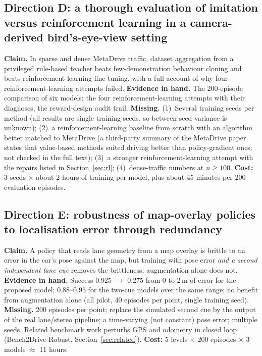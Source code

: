 \subsection{Direction D: a thorough evaluation of imitation versus reinforcement learning in a camera-derived bird's-eye-view setting}
\textbf{Claim.} In sparse and dense MetaDrive traffic, dataset aggregation from a privileged rule-based teacher beats few-demonstration behaviour cloning and beats reinforcement-learning fine-tuning, with a full account of why four reinforcement-learning attempts failed.
\textbf{Evidence in hand.} The 200-episode comparison of six models; the four reinforcement-learning attempts with their diagnoses; the reward-design audit trail.
\textbf{Missing.} (1)~Several training seeds per method (all results are single training seeds, so between-seed variance is unknown); (2)~a reinforcement-learning baseline from scratch with an algorithm better matched to MetaDrive (a third-party summary of the MetaDrive paper states that value-based methods suited driving better than policy-gradient ones; not checked in the full text); (3)~a stronger reinforcement-learning attempt with the repairs listed in Section~\ref{sec:rl}; (4)~dense-traffic numbers at $n\ge100$.
\textbf{Cost:} 3 seeds $\times$ about 2 hours of training per model, plus about 45 minutes per 200 evaluation episodes.

\subsection{Direction E: robustness of map-overlay policies to localisation error through redundancy}
\textbf{Claim.} A policy that reads lane geometry from a map overlay is brittle to an error in the car's pose against the map, but training with pose error \emph{and a second independent lane cue} removes the brittleness; augmentation alone does not.
\textbf{Evidence in hand.} Success 0.925 $\to$ 0.275 from 0 to 2\,m of error for the proposed model; $0.88$--$0.95$ for the two-cue models over the same range; no benefit from augmentation alone (all pilot, 40 episodes per point, single training seed).
\textbf{Missing.} 200 episodes per point; replace the simulated second cue by the output of the real lane/stereo pipeline; a time-varying (not constant) pose error; multiple seeds. Related benchmark work perturbs GPS and odometry in closed loop (Bench2Drive-Robust, Section~\ref{sec:related}).
\textbf{Cost:} 5 levels $\times$ 200 episodes $\times$ 3 models $\approx$ 11 hours.

